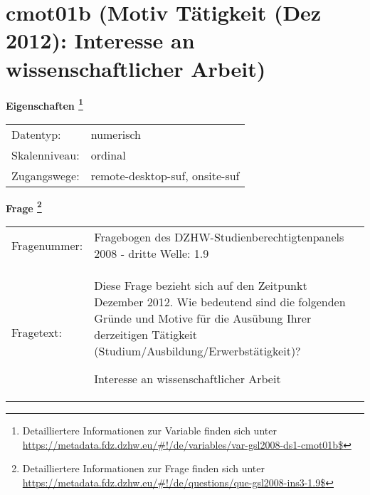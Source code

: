 
    \setcounter{footnote}{0}

    \vspace*{-1.8cm}
	\section{cmot01b (Motiv Tätigkeit (Dez 2012): Interesse an wissenschaftlicher Arbeit)}
	\label{section:cmot01b}



    \vspace*{0.5cm}
    \noindent\textbf{Eigenschaften
	\footnote{Detailliertere Informationen zur Variable finden sich unter
		\url{https://metadata.fdz.dzhw.eu/\#!/de/variables/var-gsl2008-ds1-cmot01b$}}}\\
	\begin{tabularx}{\hsize}{@{}lX}
	Datentyp: & numerisch \\
	Skalenniveau: & ordinal \\
	Zugangswege: &
	  remote-desktop-suf, 
	  onsite-suf
 \\
    \end{tabularx}



				\vspace*{0.5cm}
                \noindent\textbf{Frage
	                \footnote{Detailliertere Informationen zur Frage finden sich unter
		              \url{https://metadata.fdz.dzhw.eu/\#!/de/questions/que-gsl2008-ins3-1.9$}}}\\
				\begin{tabularx}{\hsize}{@{}lX}
					Fragenummer: &
					  Fragebogen des DZHW-Studienberechtigtenpanels 2008 - dritte Welle:
					  1.9
 \\
					Fragetext: & Diese Frage bezieht sich auf den Zeitpunkt Dezember 2012. Wie bedeutend sind die folgenden Gründe und Motive für die Ausübung Ihrer derzeitigen Tätigkeit (Studium/Ausbildung/Erwerbstätigkeit)?\par  Interesse an wissenschaftlicher Arbeit \\
				\end{tabularx}





